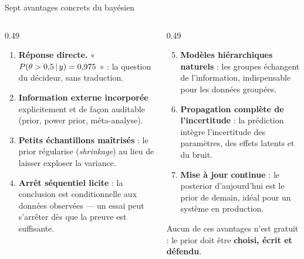 \begin{frame}{Sept avantages concrets du bayésien}
\begin{columns}[t]
\begin{column}{0.49\textwidth}
\begin{enumerate}
  \item \textbf{Réponse directe.} « $P(\theta > 0{,}5 \,\vert\, y) = 0{,}975$ » :
        la question du décideur, sans traduction.
  \item \textbf{Information externe incorporée} explicitement et de façon
        auditable (prior, power prior, méta-analyse).
  \item \textbf{Petits échantillons maîtrisés} : le prior régularise
        (\emph{shrinkage}) au lieu de laisser exploser la variance.
  \item \textbf{Arrêt séquentiel licite} : la conclusion est conditionnelle aux
        données observées — un essai peut s'arrêter dès que la preuve est suffisante.
\end{enumerate}
\end{column}
\begin{column}{0.49\textwidth}
\begin{enumerate}
  \setcounter{enumi}{4}
  \item \textbf{Modèles hiérarchiques naturels} : les groupes échangent
        de l'information, indispensable pour les données groupées.
  \item \textbf{Propagation complète de l'incertitude} : la prédiction intègre
        l'incertitude des paramètres, des effets latents et du bruit.
  \item \textbf{Mise à jour continue} : le posterior d'aujourd'hui est le prior
        de demain, idéal pour un système en production.
\end{enumerate}
\vspace{1mm}
\begin{kbox}
Aucun de ces avantages n'est gratuit : le prior doit être
\textbf{choisi, écrit et défendu}.
\end{kbox}
\end{column}
\end{columns}
\end{frame}

